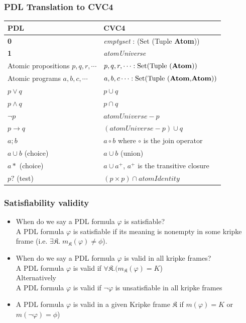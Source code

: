 \documentclass{beamer}
\begin{document}
\begin{frame}[fragile]
\frametitle{PDL Translation to CVC4}
\begin{tabular}{ll} 
\toprule
PDL & CVC4 \\    
\midrule   

\textbf{0} & \textit{emptyset} : (Set (Tuple \textbf{Atom})) \\
\textbf{1} & \textit{atomUniverse} \\
Atomic propositions $p, q, r, \cdots$ & $p, q, r, \cdots : \text{Set(Tuple (\textbf{Atom}))}$ \\
Atomic programs $a, b, c, \cdots$ & $a, b, c \cdots : \text{Set(Tuple (\textbf{Atom}$,$\textbf{Atom}))}$ \\
$p \vee q$ & $p \cup q$ \\
$p \wedge q$ & $p \cap q$ \\
$\neg p$ & $\textit{atomUniverse} - p$ \\
$p \rightarrow q$ & $(\textit{atomUniverse}- p)\cup q$ \\
$a;b$ & $a \circ b$ where $\circ$ is the join operator\\
$a \cup b$ (choice) & $a \cup b$ (union)\\
$a*$ (choice) & $a \cup a^+$, $a^+$ is the transitive closure\\
$p?$ (test) & $(p \times p) \cap \textit{atomIdentity}$\\
\bottomrule
\end{tabular}
\end{frame}

\begin{frame}[fragile]
\frametitle{Satisfiability  validity}

\begin{itemize}
\item When do we say a PDL formula $\varphi$ is satisfiable? \\
\pause
A PDL formula $\varphi$ is satisfiable if its meaning is nonempty in some kripke frame (i.e. $\exists \mathfrak{K} . \; m_{\mathfrak{K}}(\varphi) \neq \phi$). 
\vfill
\item When do we say a PDL formula $\varphi$ is valid in all kripke frames? \\
\pause 
A PDL formula $\varphi$ is valid if  $\forall \mathfrak{K} .(m_{\mathfrak{K}}(\varphi) = K$) \\
Alternatively  \\
A PDL formula $\varphi$ is valid if  $\neg \varphi$ is unsatisfiable in all kripke frames \\
\vfill
\item A PDL formula $\varphi$ is valid in a given Kripke frame $\mathfrak{K}$ if $m(\varphi) = K$ or $m(\neg \varphi) = \phi$)
\end{itemize}

\end{frame}
\end{document}
